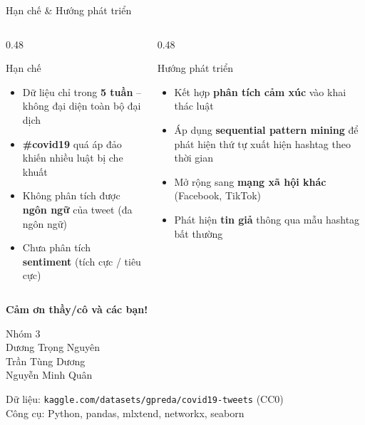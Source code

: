 \documentclass[aspectratio=169]{beamer}
\begin{document}
\begin{frame}{Hạn chế \& Hướng phát triển}
  \begin{columns}[T]
    \begin{column}{0.48\textwidth}
      \begin{alertblock}{Hạn chế}
        \begin{itemize}
          \item Dữ liệu chỉ trong \textbf{5 tuần} -- không đại diện toàn bộ đại dịch
          \item \textbf{\#covid19} quá áp đảo khiến nhiều luật bị che khuất
          \item Không phân tích được \textbf{ngôn ngữ} của tweet (đa ngôn ngữ)
          \item Chưa phân tích \textbf{sentiment} (tích cực / tiêu cực)
        \end{itemize}
      \end{alertblock}
    \end{column}
    \begin{column}{0.48\textwidth}
      \begin{block}{Hướng phát triển}
        \begin{itemize}
          \item Kết hợp \textbf{phân tích cảm xúc} vào khai thác luật
          \item Áp dụng \textbf{sequential pattern mining} để phát hiện thứ tự xuất hiện hashtag theo thời gian
          \item Mở rộng sang \textbf{mạng xã hội khác} (Facebook, TikTok)
          \item Phát hiện \textbf{tin giả} thông qua mẫu hashtag bất thường
        \end{itemize}
      \end{block}
    \end{column}
  \end{columns}
\end{frame}

\begin{frame}
  \begin{center}
    \vspace{1.5em}
    {\Huge \textbf{Cảm ơn thầy/cô và các bạn!}}

    \vspace{1.5em}

    {\large Nhóm 3}\\[0.4em]
    Dương Trọng Nguyên\\
    Trần Tùng Dương\\
    Nguyễn Minh Quân

    \vspace{1.5em}

    {\normalsize Dữ liệu: \texttt{kaggle.com/datasets/gpreda/covid19-tweets} (CC0)}\\
    {\normalsize Công cụ: Python, pandas, mlxtend, networkx, seaborn}
  \end{center}
\end{frame}
\end{document}
